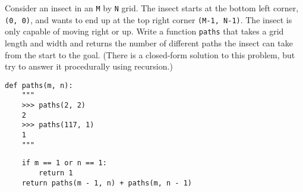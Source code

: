 \question Consider an insect in an {\tt M} by {\tt N} grid. The insect starts at the bottom left corner, {\tt (0, 0)}, and wants to end up at the top right corner {\tt (M-1, N-1)}. The insect is only capable of moving right or up. Write a function {\tt paths} that takes a grid length and width and returns the number of different paths the insect can take from the start to the goal. (There is a closed-form solution to this problem, but try to answer it procedurally using recursion.)

\begin{blocksection}
\begin{lstlisting}
def paths(m, n):
    """
    >>> paths(2, 2)
    2
    >>> paths(117, 1)
    1
    """
\end{lstlisting}
\end{blocksection}

\begin{solution}[1.2in]
\begin{lstlisting}
    if m == 1 or n == 1:
        return 1
    return paths(m - 1, n) + paths(m, n - 1)
\end{lstlisting}
\end{solution}
